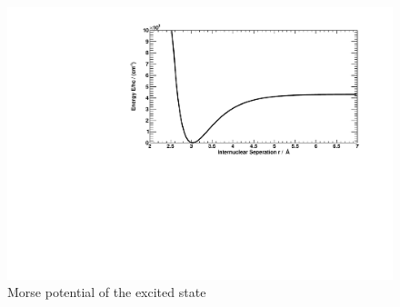 \begin{figure}[H]
\begin{center}
  \includegraphics[width=\textwidth]{../img/morse.pdf}
  \caption[---]{Morse potential of the excited state}
  \label{img:morse}
\end{center}
\end{figure}


